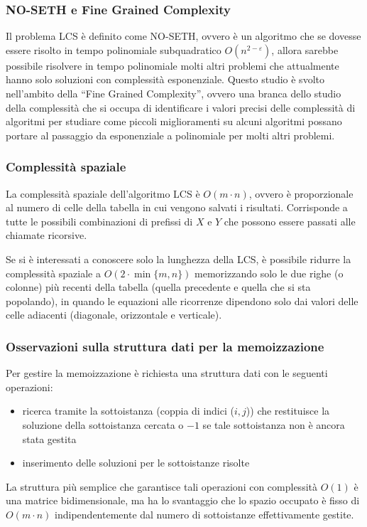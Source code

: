 \subsubsection*{NO-SETH e Fine Grained Complexity}
Il problema LCS è definito come NO-SETH, ovvero è un algoritmo che se dovesse essere risolto in tempo polinomiale subquadratico
\(O(n^{2-\varepsilon})\), allora sarebbe possibile risolvere in tempo polinomiale molti altri problemi che attualmente hanno
solo soluzioni con complessità esponenziale. Questo studio è svolto nell'ambito della ``Fine Grained Complexity'', ovvero
una branca dello studio della complessità che si occupa di identificare i valori precisi delle complessità di algoritmi per
studiare come piccoli miglioramenti su alcuni algoritmi possano portare al passaggio da esponenziale a polinomiale per molti
altri problemi.

\subsubsection*{Complessità spaziale}
La complessità spaziale dell'algoritmo LCS è \(O(m \cdot n)\), ovvero è proporzionale al numero di celle della tabella in
cui vengono salvati i risultati. Corrisponde a tutte le possibili combinazioni di prefissi di \(X\) e \(Y\) che possono
essere passati alle chiamate ricorsive.

Se si è interessati a conoscere solo la lunghezza della LCS, è possibile ridurre la complessità spaziale a \(O(2 \cdot \min\{m, n\})\)
memorizzando solo le due righe (o colonne) più recenti della tabella (quella precedente e quella che si sta popolando),
in quando le equazioni alle ricorrenze dipendono solo dai valori delle celle adiacenti (diagonale, orizzontale e verticale).

\subsubsection*{Osservazioni sulla struttura dati per la memoizzazione}
Per gestire la memoizzazione è richiesta una struttura dati con le seguenti operazioni:
\begin{itemize}
	\item ricerca tramite la sottoistanza (coppia di indici (\(i, j\))) che restituisce la soluzione della sottoistanza cercata
	o \(-1\) se tale sottoistanza non è ancora stata gestita
	\item inserimento delle soluzioni per le sottoistanze risolte
\end{itemize}
La struttura più semplice che garantisce tali operazioni con complessità \(O(1)\) è una matrice bidimensionale, ma ha lo
svantaggio che lo spazio occupato è fisso di \(O(m \cdot n)\) indipendentemente dal numero di sottoistanze effettivamente
gestite.

